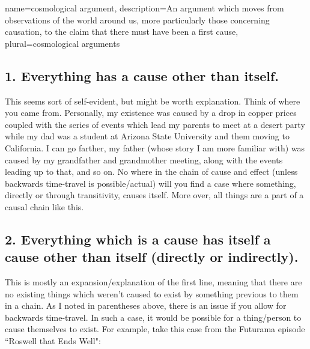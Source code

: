 {
name=cosmological argument,
description={An argument which moves from observations of the world around us, more particularly those concerning causation, to the claim that there must have been a first cause},
plural=cosmological arguments
}



\subsection{1. Everything has a cause other than itself.}

This seems sort of self-evident, but might be worth explanation. Think of where you came from. Personally, my existence was caused by a drop in copper prices coupled with the series of events which lead my parents to meet at a desert party while my dad was a student at Arizona State University and them moving to California. I can go farther, my father (whose story I am more familiar with) was caused by my grandfather and grandmother meeting, along with the events leading up to that, and so on. No where in the chain of cause and effect (unless backwards time-travel is possible/actual) will you find a case where something, directly or through transitivity, causes itself. More over, all things are a part of a causal chain like this. 

\subsection{2. Everything which is a cause has itself a cause other than itself (directly or indirectly).}

This is mostly an expansion/explanation of the first line, meaning that there are no existing things which weren't caused to exist by something previous to them in a chain. As I noted in parentheses above, there is an issue if you allow for backwards time-travel. In such a case, it would be possible for a thing/person to cause themselves to exist. For example, take this case from the Futurama episode ``Roswell that Ends Well":


